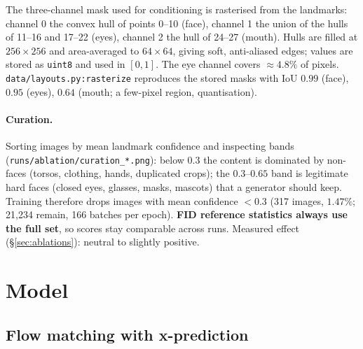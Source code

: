 \documentclass[11pt]{article}
\begin{document}
The three-channel mask used for conditioning is rasterised from the landmarks: channel 0
the convex hull of points 0--10 (face), channel 1 the union of the hulls of 11--16 and
17--22 (eyes), channel 2 the hull of 24--27 (mouth). Hulls are filled at $256\times256$
and area-averaged to $64\times64$, giving soft, anti-aliased edges; values are stored as
\texttt{uint8} and used in $[0,1]$. The eye channel covers $\approx4.8\%$ of pixels.
\texttt{data/layouts.py:rasterize} reproduces the stored masks with IoU $0.99$ (face),
$0.95$ (eyes), $0.64$ (mouth; a few-pixel region, quantisation).

\paragraph{Curation.} Sorting images by mean landmark confidence and inspecting bands
(\texttt{runs/ablation/curation\_*.png}): below $0.3$ the content is dominated by
non-faces (torsos, clothing, hands, duplicated crops); the $0.3$--$0.65$ band is
legitimate hard faces (closed eyes, glasses, masks, mascots) that a generator should
keep. Training therefore drops images with mean confidence $<0.3$ (317 images,
$1.47\%$; 21{,}234 remain, 166 batches per epoch). \textbf{FID reference statistics
always use the full set}, so scores stay comparable across runs. Measured effect
(\S\ref{sec:ablations}): neutral to slightly positive.

\section{Model}\label{sec:model}

\subsection{Flow matching with x-prediction}\label{sec:fm}
\end{document}
